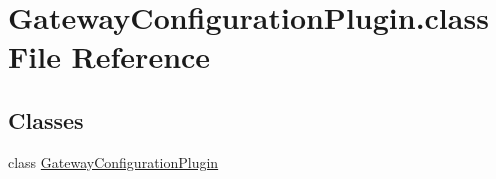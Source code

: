 \hypertarget{GatewayConfigurationPlugin_8class}{\section{Gateway\-Configuration\-Plugin.\-class File Reference}
\label{GatewayConfigurationPlugin_8class}
}
\subsection*{Classes}
\begin{DoxyCompactItemize}
\item 
class \hyperlink{classGatewayConfigurationPlugin}{Gateway\-Configuration\-Plugin}
\end{DoxyCompactItemize}
